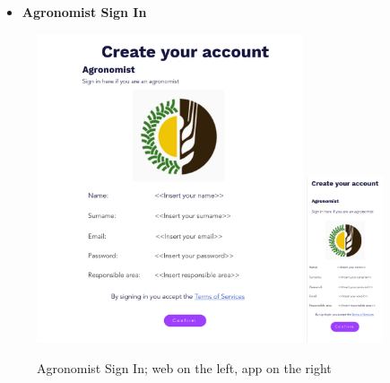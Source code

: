 \documentclass{article}
\begin{document}
    \begin{itemize}
        \item \textbf{Agronomist Sign In}
    \end{itemize}
        \begin{figure} [h]
            \centering
            \includegraphics[width=0.7\textwidth]{images/UserInterfaces/Agronomist/AgronomistSignInWeb.png}
            \quad
            \includegraphics[width=0.2\textwidth]{images/UserInterfaces/Agronomist/AgronomistSignInApp.png}
            \quad
            \caption{\label{fig:agronomistSignIn}Agronomist Sign In; web on the left, app on the right}
        \end{figure}
    
    \newpage
\end{document}
